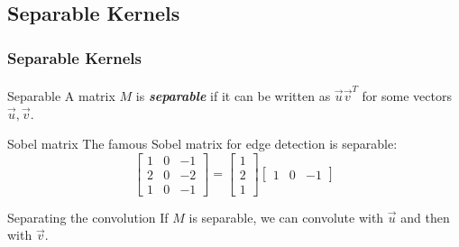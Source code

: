 \documentclass{beamer}                             %
\newcommand{\emphasis}[1]{\textbf{\textit{#1}}}
\begin{document}
\subsection{Separable Kernels}
\begin{frame}
\frametitle{Separable Kernels}
\framesubtitle{}
\begin{alertblock}{Separable}
  A matrix \( M \) is \emphasis{separable} if it can be written as
  \( \vec{u} \vec{v}^T \) for some vectors \( \vec{u}, \vec{v} \).
\end{alertblock}
\pause
\begin{exampleblock}{Sobel matrix}
  The famous Sobel matrix for edge detection is separable:
  \[
    \begin{bmatrix}
      1 & 0 & -1 \\
      2 & 0 & -2 \\
      1 & 0 & -1
    \end{bmatrix}
    =
    \begin{bmatrix}
      1 \\
      2 \\ 
      1
    \end{bmatrix}
    \begin{bmatrix}
      1 & 0 & -1
    \end{bmatrix}
  \]
\end{exampleblock}
\pause
\begin{block}{Separating the convolution}
  If \( M \) is separable, we can convolute with
  \( \vec{u} \) and then with \( \vec{v} \).
\end{block}
\end{frame}
\end{document}
